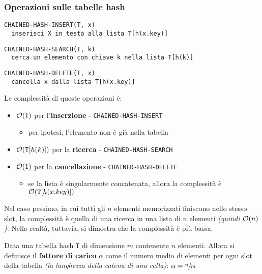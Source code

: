 \documentclass[italian, 10pt]{article}
\begin{document}
\subsubsection{Operazioni sulle tabelle hash}

\begin{lstlisting}[style=pseudocode, numbers=none]
CHAINED-HASH-INSERT(T, x)
  inserisci X in testa alla lista T[h(x.key)]
\end{lstlisting}
\begin{lstlisting}[style=pseudocode, numbers=none]
CHAINED-HASH-SEARCH(T, k)
  cerca un elemento con chiave k nella lista T[h(k)]
  \end{lstlisting}
\begin{lstlisting}[style=pseudocode, numbers=none]
CHAINED-HASH-DELETE(T, x)
  cancella x dalla lista T[h(x.key)]
    \end{lstlisting}

Le complessità di queste operazioni è:

\begin{itemize}
  \item \(\mathcal{O}(1)\) per l'\textbf{inserzione} - \texttt{CHAINED-HASH-INSERT}
        \begin{itemize}
          \item per ipotesi, l'elemento non è già nella tabella
        \end{itemize}
  \item \(\mathcal{O}(\texttt{T}[h(k)])\) per la \textbf{ricerca} - \texttt{CHAINED-HASH-SEARCH}
  \item \(\mathcal{O}(1)\) per la \textbf{cancellazione} - \texttt{CHAINED-HASH-DELETE}
        \begin{itemize}
          \item se la lista è singolarmente concatenata, allora la complessità è \(\mathcal{O}(\texttt{T}[h(x.key)])\)
        \end{itemize}
\end{itemize}

\bigskip
Nel caso pessimo, in cui tutti gli \(n\) elementi memorizzati finiscono nello stesso slot, la complessità è quella di una ricerca in una lista di \(n\) elementi \textit{(quindi \(\mathcal{O}(n)\))}.
Nella realtà, tuttavia, si dimostra che la complessità è più bassa.

Data una tabella hash \texttt{T} di dimensione \(m\) contenente \(n\) elementi.
Allora si definisce il \textbf{fattore di carico} \(\alpha\) come il numero medio di elementi per ogni slot della tabella \textit{(la lunghezza della catena di una cella)}:
\(\alpha = \sfrac{n}{m}\)
\end{document}

